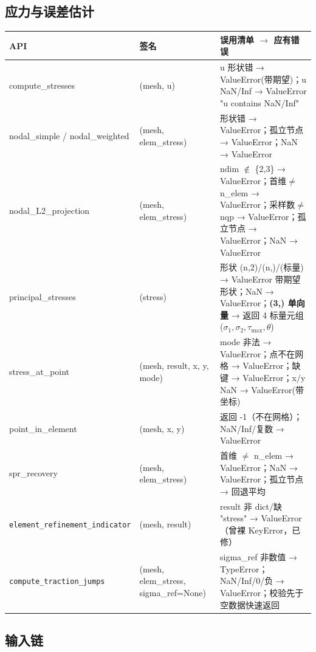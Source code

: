 \documentclass[12pt,a4paper]{ctexart}
\begin{document}
\subsection{应力与误差估计}

\begin{longtable}{p{4.2cm}p{4.0cm}p{6.0cm}}
\toprule
\textbf{API} & \textbf{签名} & \textbf{误用清单 $\to$ 应有错误} \\
\midrule
compute\_stresses & (mesh, u) & u 形状错 → ValueError(带期望)；u NaN/Inf → ValueError "u contains NaN/Inf" \\
nodal\_simple / nodal\_weighted & (mesh, elem\_stress) & 形状错 → ValueError；孤立节点 → ValueError；NaN → ValueError \\
nodal\_L2\_projection & (mesh, elem\_stress) & ndim $\notin$ \{2,3\} → ValueError；首维$\neq$n\_elem → ValueError；采样数$\neq$nqp → ValueError；孤立节点 → ValueError；NaN → ValueError \\
principal\_stresses & (stress) & 形状 (n,2)/(n,)/(标量) → ValueError 带期望形状；NaN → ValueError；\textbf{(3,) 单向量} → 返回 4 标量元组 ($\sigma_1,\sigma_2,\tau_{\mathrm{max}},\theta$) \\
stress\_at\_point & (mesh, result, x, y, mode) & mode 非法 → ValueError；点不在网格 → ValueError；缺键 → ValueError；x/y NaN → ValueError(带坐标) \\
point\_in\_element & (mesh, x, y) & 返回 -1（不在网格）；NaN/Inf/复数 → ValueError \\
spr\_recovery & (mesh, elem\_stress) & 首维 $\neq$ n\_elem → ValueError；NaN → ValueError；孤立节点 → 回退平均 \\
\texttt{element\_refinement\_\-indicator} & (mesh, result) & result 非 dict/缺 "stress" → ValueError（曾裸 KeyError，已修） \\
\texttt{compute\_traction\_\newline jumps} & (mesh, elem\_stress, sigma\_ref=None) & sigma\_ref 非数值 → TypeError；NaN/Inf/0/负 → ValueError；校验先于空数据快速返回 \\
\bottomrule
\end{longtable}

\subsection{输入链}
\end{document}
